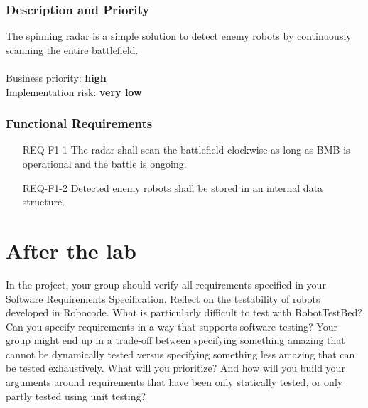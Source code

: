 \documentclass{scrreprt}
\begin{document}
\subsection{Description and Priority}
The spinning radar is a simple solution to detect enemy robots by continuously scanning the entire battlefield.\\\\Business priority: \textbf{high}\\
Implementation risk: \textbf{very low}

\subsection{Functional Requirements}
\begin{itemize}
\item[REQ-F1-1] The radar shall scan the battlefield clockwise as long as BMB is operational and the battle is ongoing.
\item[REQ-F1-2] Detected enemy robots shall be stored in an internal data structure. 
\end{itemize}

\chapter{After the lab}
In the project, your group should verify all requirements specified in your Software Requirements Specification. Reflect on the testability of robots developed in Robocode. What is particularly difficult to test with RobotTestBed? Can you specify requirements in a way that supports software testing? Your group might end up in a trade-off between specifying something amazing that cannot be dynamically  tested versus specifying something less amazing that can be tested exhaustively. What will you prioritize? And how will you build your arguments around requirements that have been only statically tested, or only partly tested using unit testing?
\end{document}
